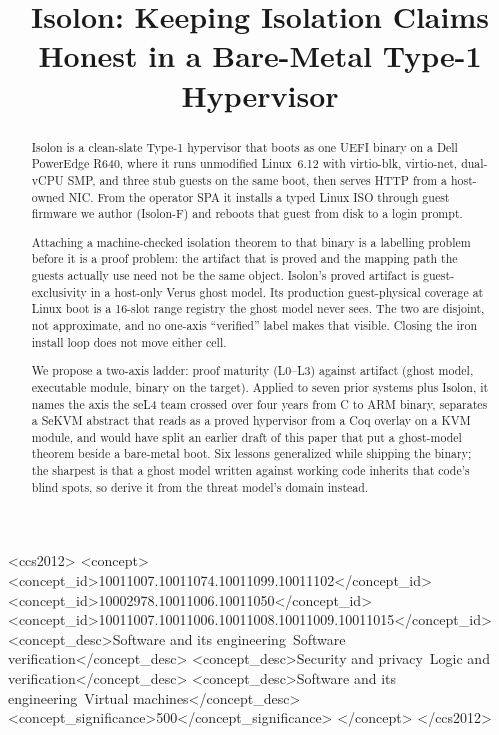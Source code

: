 \documentclass[sigplan,10pt,anonymous]{acmart}
\begin{document}
\title[Keeping Isolation Claims Honest]{Isolon: Keeping Isolation Claims Honest in a Bare-Metal Type-1 Hypervisor}

\begin{abstract}
Isolon is a clean-slate Type-1 hypervisor that boots as one UEFI binary
on a Dell PowerEdge R640, where it runs unmodified Linux~6.12 with
virtio-blk, virtio-net, dual-vCPU SMP, and three stub guests on the same
boot, then serves HTTP from a host-owned NIC. From the operator SPA it
installs a typed Linux ISO through guest firmware we author (Isolon-F)
and reboots that guest from disk to a login prompt.

Attaching a machine-checked isolation theorem to that binary is a
labelling problem before it is a proof problem: the artifact that is
proved and the mapping path the guests actually use need not be the same
object. Isolon's proved artifact is guest-exclusivity in a host-only
Verus ghost model. Its production guest-physical coverage at Linux boot
is a 16-slot range registry the ghost model never sees. The two are
disjoint, not approximate, and no one-axis ``verified'' label makes that
visible. Closing the iron install loop does not move either cell.

We propose a two-axis ladder: proof maturity (L0--L3) against artifact
(ghost model, executable module, binary on the target). Applied to seven
prior systems plus Isolon, it names the axis the seL4 team crossed over
four years from C to ARM binary, separates a SeKVM abstract that reads as
a proved hypervisor from a Coq overlay on a KVM module, and would have
split an earlier draft of this paper that put a ghost-model theorem beside
a bare-metal boot. Six lessons generalized while shipping the binary; the
sharpest is that a ghost model written against working code inherits that
code's blind spots, so derive it from the threat model's domain instead.
\end{abstract}

\begin{CCSXML}
<ccs2012>
 <concept>
  <concept_id>10011007.10011074.10011099.10011102</concept_id>
  <concept_id>10002978.10011006.10011050</concept_id>
  <concept_id>10011007.10011006.10011008.10011009.10011015</concept_id>
  <concept_desc>Software and its engineering~Software verification</concept_desc>
  <concept_desc>Security and privacy~Logic and verification</concept_desc>
  <concept_desc>Software and its engineering~Virtual machines</concept_desc>
  <concept_significance>500</concept_significance>
 </concept>
</ccs2012>
\end{CCSXML}
\end{document}
